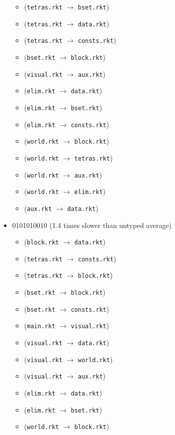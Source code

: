 \documentclass{article}
\newcommand{\mono}[1]{\texttt{#1}}
\begin{document}
\begin{itemize}
\begin{itemize}
  \item (\mono{tetras.rkt} $\rightarrow$ \mono{bset.rkt})
  \item (\mono{tetras.rkt} $\rightarrow$ \mono{data.rkt})
  \item (\mono{tetras.rkt} $\rightarrow$ \mono{consts.rkt})
  \item (\mono{bset.rkt} $\rightarrow$ \mono{block.rkt})
  \item (\mono{visual.rkt} $\rightarrow$ \mono{aux.rkt})
  \item (\mono{elim.rkt} $\rightarrow$ \mono{data.rkt})
  \item (\mono{elim.rkt} $\rightarrow$ \mono{bset.rkt})
  \item (\mono{elim.rkt} $\rightarrow$ \mono{consts.rkt})
  \item (\mono{world.rkt} $\rightarrow$ \mono{block.rkt})
  \item (\mono{world.rkt} $\rightarrow$ \mono{tetras.rkt})
  \item (\mono{world.rkt} $\rightarrow$ \mono{aux.rkt})
  \item (\mono{world.rkt} $\rightarrow$ \mono{elim.rkt})
  \item (\mono{aux.rkt} $\rightarrow$ \mono{data.rkt})
  \end{itemize}
\item 0101010010 (1.4 times slower than untyped average)
  \begin{itemize}
  \item (\mono{block.rkt} $\rightarrow$ \mono{data.rkt})
  \item (\mono{tetras.rkt} $\rightarrow$ \mono{consts.rkt})
  \item (\mono{tetras.rkt} $\rightarrow$ \mono{block.rkt})
  \item (\mono{bset.rkt} $\rightarrow$ \mono{block.rkt})
  \item (\mono{bset.rkt} $\rightarrow$ \mono{consts.rkt})
  \item (\mono{main.rkt} $\rightarrow$ \mono{visual.rkt})
  \item (\mono{visual.rkt} $\rightarrow$ \mono{data.rkt})
  \item (\mono{visual.rkt} $\rightarrow$ \mono{world.rkt})
  \item (\mono{visual.rkt} $\rightarrow$ \mono{aux.rkt})
  \item (\mono{elim.rkt} $\rightarrow$ \mono{data.rkt})
  \item (\mono{elim.rkt} $\rightarrow$ \mono{bset.rkt})
  \item (\mono{world.rkt} $\rightarrow$ \mono{block.rkt})

\end{itemize}
\end{itemize}
\end{document}
